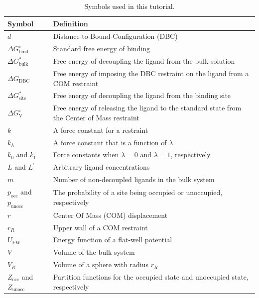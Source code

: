 \documentclass[9pt,tutorial]{Styling/livecoms}
\begin{document}
\twocolumn
\begin{table}[H]
    \centering
    \caption{Symbols used in this tutorial.}
    \label{tab:variables}
    \begin{tabular}{  p{.26\linewidth} | p{.7\linewidth}  }
        \textbf{Symbol} & \textbf{Definition}\\
        \hline
        $d$ & Distance-to-Bound-Configuration (DBC) \\
        \hline
        $\Delta G^\circ_\mathrm{bind}$ & Standard free energy of binding\\
        \hline 
        $\Delta G^*_\mathrm{bulk}$ & Free energy of decoupling the ligand from the bulk solution \\
        \hline 
        $\Delta G_\mathrm{DBC}$ & Free energy of imposing the DBC restraint on the ligand from a COM restraint \\
        \hline
        $\Delta G^*_\mathrm{site}$ & Free energy of decoupling the ligand from the binding site \\
        \hline 
        $\Delta G^\circ_\mathrm{V}$ & Free energy of releasing the ligand to the standard state from the Center of Mass restraint\\
        \hline 
        $k$ & A force constant for a restraint\\
        \hline
        $k_\lambda$ & A force constant that is a function of $\lambda$\\
        \hline
        $k_0$ and $k_1$ & Force constants when $\lambda=0$ and $\lambda=1$, respectively\\
        \hline
        $L$ and $L^\prime$ & Arbitrary ligand concentrations\\
        \hline
        $m$ & Number of non-decoupled ligands in the bulk system\\
        \hline
        $p_\mathrm{occ}$ and $p_\mathrm{unocc}$ & The probability of a site being occupied or unoccupied, respectively\\
        \hline
        $r$ & Center Of Mass (COM) displacement\\
        \hline
        $r_R$ & Upper wall of a COM restraint\\
        \hline
        $U_\mathrm{FW}$ & Energy function of a flat-well potential\\
        \hline
        $V$ & Volume of the bulk system\\
        \hline
        $V_R$ & Volume of a sphere with radius $r_R$\\
        \hline
        $Z_\mathrm{occ}$ and $Z_\mathrm{unocc}$ & Partition functions for the occupied state and unoccupied state, respectively\\

\end{tabular}
\end{table}
\end{document}
